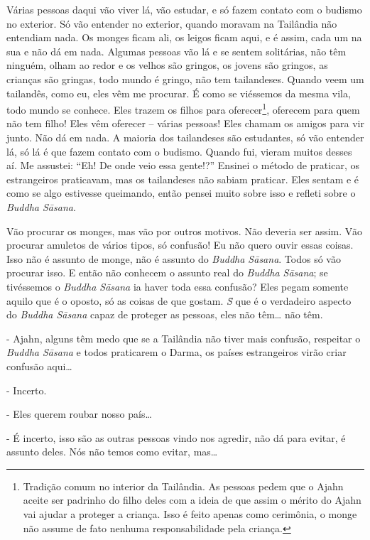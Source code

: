 Várias pessoas daqui vão viver lá, vão estudar, e só fazem contato
com o budismo no exterior. Só vão entender no exterior, quando moravam
na Tailândia não entendiam nada. Os monges ficam ali, os leigos ficam
aqui, e é assim, cada um na sua e não dá em nada. Algumas pessoas vão
lá e se sentem solitárias, não têm ninguém, olham ao redor e os velhos
são gringos, os jovens são gringos, as crianças são gringas, todo mundo
é gringo, não tem tailandeses. Quando veem um tailandês, como eu, eles
vêm me procurar. É como se viéssemos da mesma vila, todo mundo se
conhece. Eles trazem os filhos para oferecer\footnote{Tradição comum no
interior da Tailândia. As pessoas pedem que o Ajahn aceite ser padrinho
do filho deles com a ideia de que assim o mérito do Ajahn vai ajudar a
proteger a criança. Isso é feito apenas como cerimônia, o monge não
assume de fato nenhuma responsabilidade pela criança.}, oferecem para
quem não tem filho! Eles vêm oferecer – várias pessoas! Eles chamam os
amigos para vir junto. Não dá em nada. A maioria dos tailandeses são
estudantes, só vão entender lá, só lá é que fazem contato com o
budismo. Quando fui, vieram muitos desses aí. Me assustei: “Eh! De onde
veio essa gente!?” Ensinei o método de praticar, os estrangeiros
praticavam, mas os tailandeses não sabiam praticar. Eles sentam e é
como se algo estivesse queimando, então pensei muito sobre isso e
refleti sobre o \textit{Buddha S\=asana}. 

Vão procurar os monges, mas vão por outros motivos. Não deveria ser
assim. Vão procurar amuletos de vários tipos, só confusão! Eu não quero
ouvir essas coisas. Isso não é assunto de monge, não é assunto do
\textit{Buddha S\=asana}. Todos só vão procurar isso. E então não
conhecem o assunto real do \textit{Buddha S\=asana}; se tivéssemos o
\textit{Buddha S\=asana} ia haver toda essa confusão? Eles pegam
somente aquilo que é o oposto, só as coisas de que gostam.
\textit{S\=\ila} que é o verdadeiro aspecto do \textit{Buddha S\=asana}
capaz de proteger as pessoas, eles não têm… não têm. 

{}- Ajahn, alguns têm medo que se a Tailândia não tiver mais
confusão, respeitar o \textit{Buddha S\=asana }e todos praticarem o
Darma, os países estrangeiros virão criar confusão aqui…

{}- Incerto.

{}- Eles querem roubar nosso país…

{}- É incerto, isso são as outras pessoas vindo nos agredir, não dá
para evitar, é assunto deles. Nós não temos como evitar, mas…

